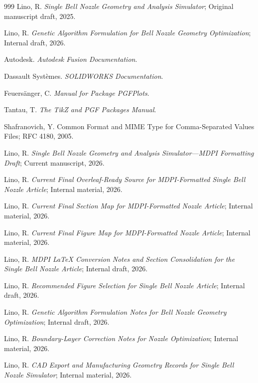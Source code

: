 \documentclass[journal,article,submit,oneauthor]{Definitions/mdpi}
\begin{document}
\begin{thebibliography}{999}
Lino, R. \textit{Single Bell Nozzle Geometry and Analysis Simulator}; Original manuscript draft, 2025.

Lino, R. \textit{Genetic Algorithm Formulation for Bell Nozzle Geometry Optimization}; Internal draft, 2026.

Autodesk. \textit{Autodesk Fusion Documentation}.

Dassault Systèmes. \textit{SOLIDWORKS Documentation}.

Feuersänger, C. \textit{Manual for Package PGFPlots}.

Tantau, T. \textit{The TikZ and PGF Packages Manual}.

Shafranovich, Y. Common Format and MIME Type for Comma-Separated Values Files; RFC 4180, 2005.

Lino, R. \textit{Single Bell Nozzle Geometry and Analysis Simulator---MDPI Formatting Draft}; Current manuscript, 2026.

Lino, R. \textit{Current Final Overleaf-Ready Source for MDPI-Formatted Single Bell Nozzle Article}; Internal material, 2026.

Lino, R. \textit{Current Final Section Map for MDPI-Formatted Nozzle Article}; Internal material, 2026.

Lino, R. \textit{Current Final Figure Map for MDPI-Formatted Nozzle Article}; Internal material, 2026.

Lino, R. \textit{MDPI LaTeX Conversion Notes and Section Consolidation for the Single Bell Nozzle Article}; Internal draft, 2026.

Lino, R. \textit{Recommended Figure Selection for Single Bell Nozzle Article}; Internal draft, 2026.

Lino, R. \textit{Genetic Algorithm Formulation Notes for Bell Nozzle Geometry Optimization}; Internal draft, 2026.

Lino, R. \textit{Boundary-Layer Correction Notes for Nozzle Optimization}; Internal material, 2026.

Lino, R. \textit{CAD Export and Manufacturing Geometry Records for Single Bell Nozzle Simulator}; Internal material, 2026.


\end{thebibliography}
\end{document}
